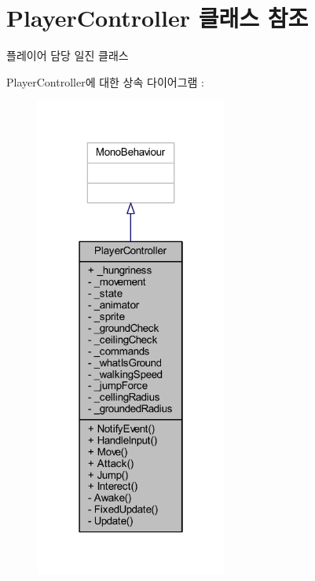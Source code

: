\hypertarget{class_player_controller}{}\section{Player\+Controller 클래스 참조}
\label{class_player_controller}


플레이어 담당 일진 클래스  




Player\+Controller에 대한 상속 다이어그램 \+: \nopagebreak
\begin{figure}[H]
\begin{center}
\leavevmode
\includegraphics[width=178pt]{d1/dc2/class_player_controller__inherit__graph}
\end{center}
\end{figure}


